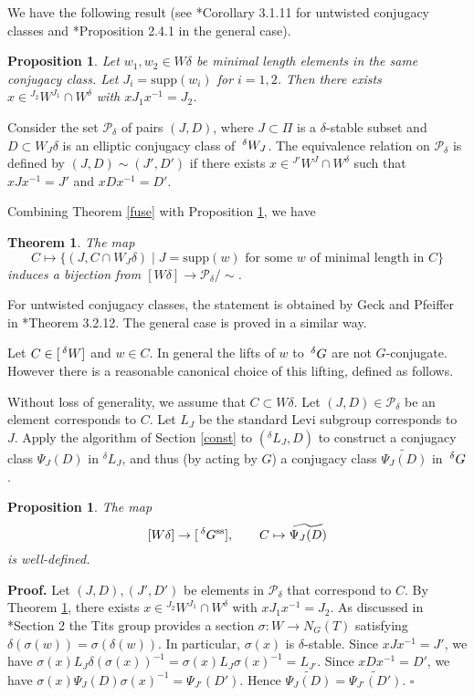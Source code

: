 \documentclass[10pt,leqno]{article}
\newtheorem{theorem}[equation]{Theorem}
\newtheorem{proposition}[equation]{Proposition}
\newcommand{\qed}{\hfill $\square$ \medskip}
\newenvironment{proof}[1][Proof]{\noindent\textbf{#1.} }{\qed}
\renewcommand{\ss}{\text{ss}}
\newcommand{\Wext}{\negthinspace\negthinspace\phantom{a}^\delta W}
\newcommand{\Gext}{\negthinspace\negthinspace\phantom{a}^\delta G}
\begin{document}
We have the following result (see \cite{geck_pfeiffer}*{Corollary
3.1.11} for untwisted conjugacy classes and \cite{CH}*{Proposition
2.4.1} in the general case).

\begin{proposition}\label{x-delta}
	Let $w_1, w_2 \in W\delta$ be minimal length elements in the same conjugacy class. Let $J_i=\text{supp}(w_i)$ for $i=1,2$. Then there exists $x \in {}^{J_2} W^{J_1} \cap W^\delta$ with $x J_1 x^{-1}=J_2$. 
\end{proposition}

Consider the set $\mathcal P_{\delta}$ of pairs $(J, D)$, where $J \subset \Pi$ is a $\delta$-stable subset and $D \subset W_J \delta$ is an elliptic conjugacy class of $\Wext_J$. The equivalence relation on $\mathcal P_{\delta}$ is defined by $(J, D) \sim (J', D')$ if there exists $x \in {}^{J'} W^J \cap W^\delta$ such that $x J x^{-1}=J'$ and $x D x^{-1}=D'$. 

Combining Theorem \ref{fuse} with Proposition \ref{x-delta}, we have 

\begin{theorem}\label{cal-P}
	The map $$C \mapsto \{(J, C \cap W_J \delta)\mid J=\text{supp}(w) \text{ for some } w \text{ of minimal length in } C\}$$ induces a bijection from $[W\delta] \to \mathcal P_{\delta}/\sim$. 
\end{theorem}

For untwisted conjugacy classes, the statement is obtained by Geck and
Pfeiffer in \cite{geck_pfeiffer}*{Theorem 3.2.12}. The general case is
proved in a similar way.

Let $C\in [\Wext]$ and $w \in C$. In general the lifts of $w$ to $\Gext$ are not $G$-conjugate. However there is a reasonable canonical choice of this lifting, defined as follows.

Without loss of generality, we assume that $C \subset W \delta$. Let $(J, D) \in \mathcal P_{\delta}$ be an element corresponds to $C$. Let $L_J$ be the standard Levi subgroup corresponds to $J$.  Apply the algorithm of Section \ref{const} to $({}^\delta L_J, D)$ to construct a conjugacy class $\Psi_J(D)$ in ${}^\delta L_J$, and thus (by acting by $G$) a conjugacy class $\widetilde{\Psi_J(D)}$ in $\Gext$.

\begin{proposition} The map $$[W \delta] \to [\Gext^{\ss}], \qquad C \mapsto \widetilde{\Psi_J(D)}$$ is well-defined. 
\end{proposition}

\begin{proof}
	Let $(J, D), (J', D')$ be elements in $\mathcal P_{\delta}$ that correspond to $C$. By Theorem \ref{cal-P}, there exists $x \in {}^{J_2} W^{J_1} \cap W^\delta$ with $x J_1 x^{-1}=J_2$. As discussed in \cite{AH}*{Section 2} the Tits group provides a section $\sigma:W\rightarrow N_G(T)$ satisfying
	$\delta(\sigma(w))=\sigma(\delta(w))$. In particular, $\sigma(x)$ is $\delta$-stable. Since $x J x^{-1}=J'$, we have $\sigma(x) L_J \delta(\sigma(x))^{-1}=\sigma(x) L_J \sigma(x)^{-1}=L_{J'}$. Since $x D x^{-1}=D'$, we have $\sigma(x) \Psi_J(D) \sigma(x)^{-1}=\Psi_{J'}(D')$. Hence $\widetilde{\Psi_J(D)}=\widetilde{\Psi_{J'}(D')}$. 
\end{proof}
\end{document}
